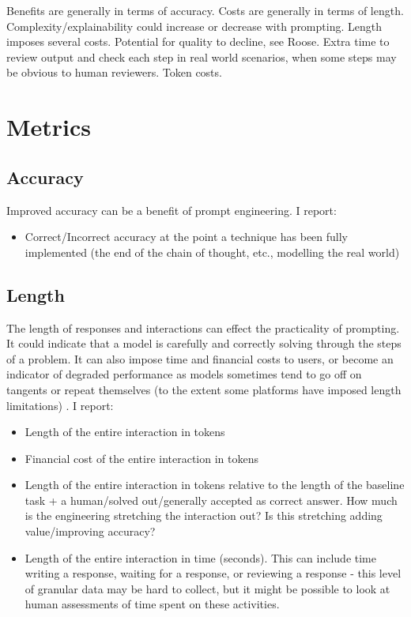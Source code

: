 \documentclass[11pt]{article}
\begin{document}
Benefits are generally in terms of accuracy.
Costs are generally in terms of length.
Complexity/explainability could increase or decrease with prompting.
Length imposes several costs. Potential for quality to decline, see Roose. Extra time to review output and check each step in real world scenarios, when some steps may be obvious to human reviewers. Token costs.

\section*{Metrics}

\subsection*{Accuracy}

Improved accuracy can be a benefit of prompt engineering. I report:

\begin{itemize}
  \item Correct/Incorrect accuracy at the point a technique has been fully implemented (the end of the chain of thought, etc., modelling the real world)
\end{itemize}

\subsection*{Length}

The length of responses and interactions can effect the practicality of prompting. It could indicate that a model is carefully and correctly solving through the steps of a problem. It can also impose time and financial costs to users, or become an indicator of degraded performance as models sometimes tend to go off on tangents or repeat themselves (to the extent some platforms have imposed length limitations) \cite{mann_microsoft_nodate}. I report:

\begin{itemize}
  \item Length of the entire interaction in tokens
  \item Financial cost of the entire interaction in tokens
  \item Length of the entire interaction in tokens relative to the length of the baseline task + a human/solved out/generally accepted as correct answer. How much is the engineering stretching the interaction out? Is this stretching adding value/improving accuracy?
  \item Length of the entire interaction in time (seconds). This can include time writing a response, waiting for a response, or reviewing a response - this level of granular data may be hard to collect, but it might be possible to look at human assessments of time spent on these activities.
\end{itemize}
\end{document}
